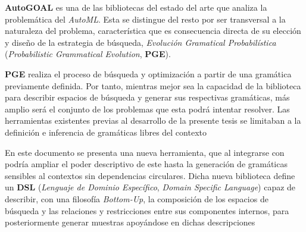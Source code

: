 \begin{resumen}
  {\bf AutoGOAL} es una de las bibliotecas del estado del arte que analiza la
  problemática del {\it AutoML}. Esta se distingue del resto por ser transversal
  a la naturaleza del problema, característica que es consecuencia directa
  de su elección y diseño de la estrategia de búsqueda,
  {\it Evolución Gramatical Probabilística}
  ({\it Probabilistic Grammatical Evolution}, {\bf PGE}).

    {\bf PGE} realiza el proceso de búsqueda y optimización a partir de una
  gramática previamente definida. Por tanto, mientras mejor sea la
  capacidad de la biblioteca para describir espacios de búsqueda y generar
  sus respectivas gramáticas, más amplio será el conjunto de los problemas
  que esta podrá intentar resolver. Las herramientas existentes previas al
  desarrollo de la presente tesis se limitaban a la definición e inferencia
  de gramáticas libres del contexto

  En este documento se presenta una nueva herramienta, que al integrarse con
   podría ampliar el poder descriptivo de este hasta la
  generación de gramáticas sensibles al contextos sin dependencias circulares.
  Dicha nueva biblioteca define un {\bf DSL}
  ({\it Lenguaje de Dominio Específico}, {\it Domain Specific Language}) capaz de
  describir, con una filosofía {\it Bottom-Up}, la composición de los
  espacios de búsqueda y las relaciones y restricciones entre sus
  componentes internos, para posteriormente generar muestras apoyándose en
  dichas descripciones

\end{resumen}

